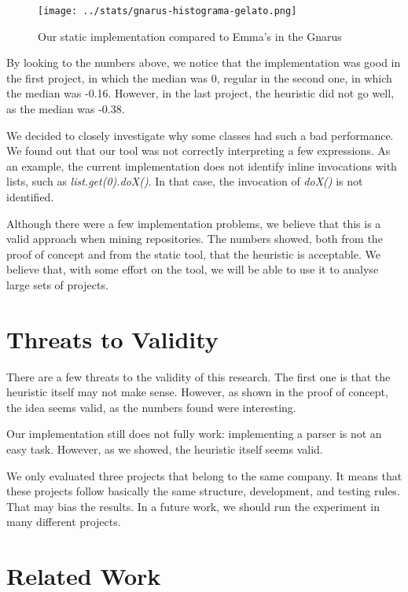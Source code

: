 \documentclass{sig-alternate}
\begin{document}
\begin{figure}[h!H]
  \centering
  \texttt{[image: ../stats/gnarus-histograma-gelato.png]}
  \caption{Our static implementation compared to Emma's in the Gnarus}
  \label{fig:gnarus}
\end{figure}

By looking to the numbers above, we notice that the implementation was good in the first project,
in which the median was 0, regular in the second one, in which the median was -0.16. However,
in the last project, the heuristic did not go well, as the median was -0.38.

We decided to closely investigate why some classes had such a bad performance. We found out
that our tool was not correctly interpreting a few expressions. As an example, 
the current implementation does not identify inline invocations with lists, such
as \textit{list.get(0).doX()}. In that case, the invocation of \textit{doX()} is not identified.

Although there were a few implementation problems, we believe that this is a valid approach
when mining repositories. The numbers showed, both from the proof of concept and from the
static tool, that the heuristic is acceptable. We believe that, with some effort on the tool,
we will be able to use it to analyse large sets of projects.


\section{Threats to Validity}
\label{sec-threats}

There are a few threats to the validity of this research. The first one is that the
heuristic itself may not make sense. However, as shown in the proof of concept,
the idea seems valid, as the numbers found were interesting.

Our implementation
still does not fully work: implementing a parser is not an easy task. However, as we showed, the 
heuristic itself seems valid.

We only evaluated three projects that belong to the same company. It means that these projects
follow basically the same structure, development, and testing rules. That may bias the results.
In a future work, we should run the experiment in many different projects.

\section{Related Work}
\label{sec-related-work}
\end{document}
